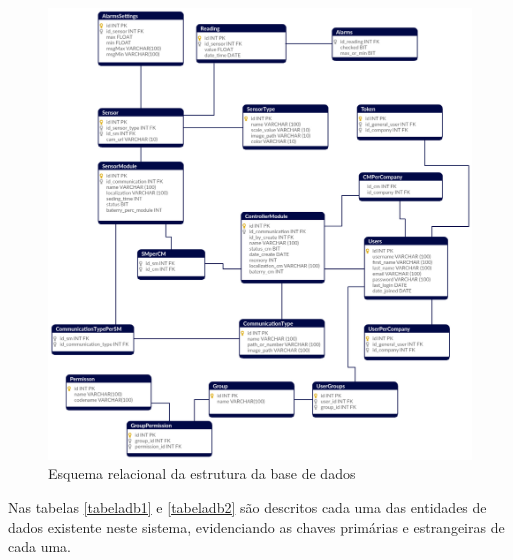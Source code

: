 \begin{figure}[!htb]
	\centering
	\includegraphics[width=\linewidth]{esquemas/database_tese.pdf}
	\caption{Esquema relacional da estrutura da base de dados}
	\label{esquemarelacional}
\end{figure}


Nas tabelas \ref{tabeladb1} e \ref{tabeladb2} são descritos cada uma das entidades de dados existente neste sistema, evidenciando as chaves primárias e estrangeiras de cada uma. 



